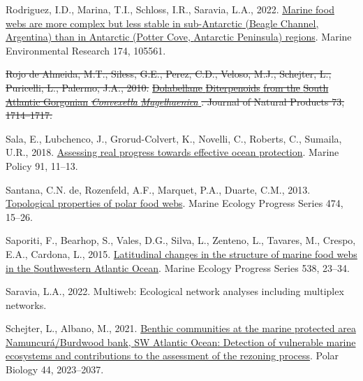 \documentclass[
]{article}
\newlength{\cslhangindent}
\newenvironment{CSLReferences}[2] %
 {\begin{list}{}{%
  \setlength{\itemindent}{0pt}
  \setlength{\leftmargin}{0pt}
  \setlength{\parsep}{0pt}
  \ifodd #1
   \setlength{\leftmargin}{\cslhangindent}
   \setlength{\itemindent}{-1\cslhangindent}
  \fi
  \setlength{\itemsep}{#2\baselineskip}}}
 {\end{list}}
\providecommand{\DIFdel}[1]{{\protect\color{red}\sout{#1}}}                      %
\providecommand{\DIFdelbegin}{} %
\providecommand{\DIFdelend}{} %
\newcommand{\DIFscaledelfig}{0.5}
\newlength{\DIFdelgraphicswidth} %
\newlength{\DIFdelgraphicsheight} %
\newcommand{\DIFdelincludegraphics}[2][]{%
\sbox{\DIFdelgraphicsbox}{\DIFOincludegraphics[#1]{#2}}%
\settoboxwidth{\DIFdelgraphicswidth}{\DIFdelgraphicsbox} %
\settoboxtotalheight{\DIFdelgraphicsheight}{\DIFdelgraphicsbox} %
\scalebox{\DIFscaledelfig}{%
\parbox[b]{\DIFdelgraphicswidth}{\usebox{\DIFdelgraphicsbox}\\[-\baselineskip] \rule{\DIFdelgraphicswidth}{0em}}\llap{\resizebox{\DIFdelgraphicswidth}{\DIFdelgraphicsheight}{%
\setlength{\unitlength}{\DIFdelgraphicswidth}%
\begin{picture}(1,1)%
\thicklines\linethickness{2pt} %
{\color[rgb]{1,0,0}\put(0,0){\framebox(1,1){}}}%
{\color[rgb]{1,0,0}\put(0,0){\line( 1,1){1}}}%
{\color[rgb]{1,0,0}\put(0,1){\line(1,-1){1}}}%
\end{picture}%
}\hspace*{3pt}}} %
} %
\DeclareRobustCommand{\DIFdelbegin}{\DIFOdelbegin \let\includegraphics\DIFdelincludegraphics} %
\DeclareRobustCommand{\DIFdelend}{\DIFOaddend \let\includegraphics\DIFOincludegraphics} %
\begin{document}
\begin{CSLReferences}{1}{0}
Rodriguez, I.D., Marina, T.I., Schloss, I.R., Saravia, L.A., 2022.
\href{https://doi.org/10.1016/j.marenvres.2022.105561}{Marine food webs
are more complex but less stable in sub-{Antarctic} ({Beagle Channel},
{Argentina}) than in {Antarctic} ({Potter Cove}, {Antarctic Peninsula})
regions}. Marine Environmental Research 174, 105561.

\DIFdelbegin {}
\DIFdel{Rojo de Almeida, M.T., Siless, G.E., Perez, C.D., Veloso, M.J.,
Schejter, L., Puricelli, L., Palermo, J.A., 2010.
}\href{https://doi.org/10.1021/np100337j}{\DIFdel{Dolabellane }%
\DIFdel{Diterpenoids}%
\DIFdel{from
the }%
\DIFdel{South Atlantic Gorgonian}%
\emph{\DIFdel{Convexella}}%
\emph{\DIFdel{Magelhaenica}}%
}%
\DIFdel{. Journal of Natural Products 73, 1714--1717.
}%

\DIFdelend {}
Sala, E., Lubchenco, J., Grorud-Colvert, K., Novelli, C., Roberts, C.,
Sumaila, U.R., 2018.
\href{https://doi.org/10.1016/j.marpol.2018.02.004}{Assessing real
progress towards effective ocean protection}. Marine Policy 91, 11--13.

Santana, C.N. de, Rozenfeld, A.F., Marquet, P.A., Duarte, C.M., 2013.
\href{https://doi.org/10.3354/meps10073}{Topological properties of polar
food webs}. Marine Ecology Progress Series 474, 15--26.

Saporiti, F., Bearhop, S., Vales, D.G., Silva, L., Zenteno, L., Tavares,
M., Crespo, E.A., Cardona, L., 2015.
\href{https://doi.org/10.3354/meps11464}{Latitudinal changes in the
structure of marine food webs in the {Southwestern Atlantic Ocean}}.
Marine Ecology Progress Series 538, 23--34.

Saravia, L.A., 2022. Multiweb: {Ecological} network analyses including
multiplex networks.

Schejter, L., Albano, M., 2021.
\href{https://doi.org/10.1007/s00300-021-02936-y}{Benthic communities at
the marine protected area {Namuncur{á}}/{Burdwood} bank, {SW Atlantic
Ocean}: Detection of vulnerable marine ecosystems and contributions to
the assessment of the rezoning process}. Polar Biology 44, 2023--2037.


\end{CSLReferences}
\end{document}
